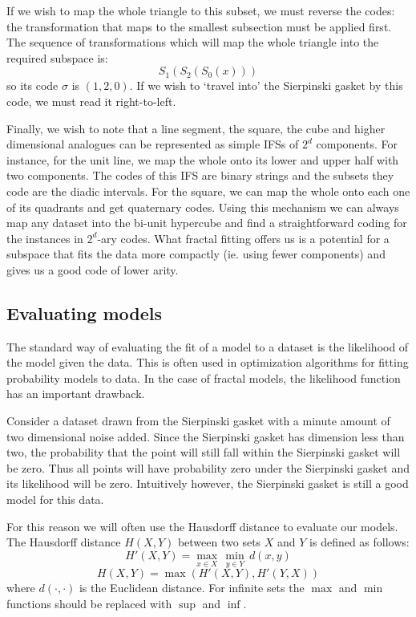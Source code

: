\documentclass[10pt,a4paper,oneside]{article}
\theoremstyle{definition}
\begin{document}
If we wish to map the whole triangle to this subset, we must reverse the codes: the transformation that maps to the smallest subsection must be applied first. The sequence of transformations which will map the whole triangle into the required subspace is:
\[
S_1(S_2(S_0(x)))
\]
so its code $\sigma$ is $(1, 2, 0)$. If we wish to `travel into' the Sierpinski gasket by this code, we must read it right-to-left.

Finally, we wish to note that a line segment, the square, the cube and higher dimensional analogues can be represented as simple IFSs of $2^d$ components. For instance, for the unit line, we map the whole onto its lower and upper half with two components. The codes of this IFS are binary strings and the subsets they code are the diadic intervals. For the square, we can map the whole onto each one of its quadrants and get quaternary codes. Using this mechanism we can always map any dataset into the bi-unit hypercube and find a straightforward coding for the instances in $2^d$-ary codes. What fractal fitting offers us is a potential for a subspace that fits the data more compactly (ie. using fewer components) and gives us a good code of lower arity.

\subsection*{Evaluating models}

The standard way of evaluating the fit of a model to a dataset is the likelihood of the model given the data. This is often used in optimization algorithms for fitting probability models to data. In the case of fractal models, the likelihood function has an important drawback. 

Consider a dataset drawn from the Sierpinski gasket with a minute amount of two dimensional noise added. Since the Sierpinski gasket has dimension less than two, the probability that the point will still fall within the Sierpinski gasket will be zero. Thus all points will have probability zero under the Sierpinski gasket and its likelihood will be zero. Intuitively however, the Sierpinski gasket is still a good model for this data.

For this reason we will often use the Hausdorff distance to evaluate our models. The Hausdorff distance  $H(X, Y)$ between two sets $X$ and $Y$ is defined as follows:
\[ 
H'(X, Y) = \max_{x\in X} \, \min_{y\in Y} \, d(x, y) 
\]
\[
H(X, Y) = \max\left (H'(X, Y), H'(Y, X)\right )
\]
where $d(\cdot, \cdot)$ is the Euclidean distance. For infinite sets the $\max$ and $\min$ functions should be replaced with $\sup$ and $\inf$.
 
\end{document}
